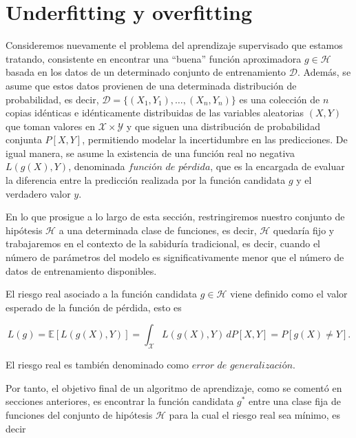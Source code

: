 \section{Underfitting y overfitting}\label{sec:subsec-underfitting-y-overfitting}

Consideremos nuevamente el problema del aprendizaje supervisado que estamos tratando, consistente en encontrar una ``buena'' función aproximadora $g \in \mathcal{H}$ basada en los datos de un determinado conjunto de entrenamiento $\mathcal{D}$. Además, se asume que estos datos provienen de una determinada distribución de probabilidad, es decir, $\mathcal{D} = \{(X_{1}, Y_{1}), \ldots, (X_{n}, Y_{n})\}$ es una colección de $n$ copias idénticas e idénticamente distribuidas de las variables aleatorias $(X, Y)$ que toman valores en $\mathcal{X} \times \mathcal{Y}$ y que siguen una distribución de probabilidad conjunta $P[X, Y]$, permitiendo modelar la incertidumbre en las predicciones. De igual manera, se asume la existencia de una función real no negativa $L(g(X), Y)$, denominada $\textit{función de pérdida}$, que es la encargada de evaluar la diferencia entre la predicción realizada por la función candidata $g$ y el verdadero valor $y$.\newline

En lo que prosigue a lo largo de esta sección, restringiremos nuestro conjunto de hipótesis $\mathcal{H}$ a una determinada clase de funciones, es decir, $\mathcal{H}$ quedaría fijo y trabajaremos en el contexto de la sabiduría tradicional, es decir, cuando el número de parámetros del modelo es significativamente menor que el número de datos de entrenamiento disponibles.\newline

\begin{definicion}\label{def:riesgo-real}
    El riesgo real asociado a la función candidata $g \in \mathcal{H}$ viene definido como el valor esperado de la función de pérdida, esto es

    \[ L(g) = \mathbb{E}[L(g(X), Y)] = \int_{\mathcal{X}} L(g(X), Y) \, dP[X, Y] = P[g(X) \neq Y].\]

    El riesgo real es también denominado como $\textit{error de generalización}$.\newline
\end{definicion}

Por tanto, el objetivo final de un algoritmo de aprendizaje, como se comentó en secciones anteriores, es encontrar la función candidata $g^{*}$ entre una clase fija de funciones del conjunto de hipótesis $\mathcal{H}$ para la cual el riesgo real sea mínimo, es decir

